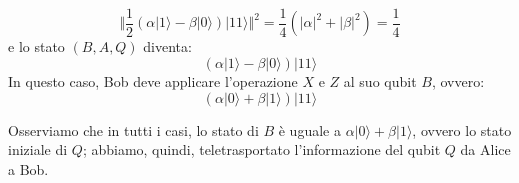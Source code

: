 \begin{itemize}
    \begin{equation*}
        \Vert \frac{1}{2}\left(\alpha |1\rangle - \beta |0\rangle\right)|11\rangle \Vert^2 = \frac{1}{4}\left(|\alpha|^2 + |\beta|^2\right) = \frac{1}{4}
    \end{equation*}
    e lo stato $(B,A,Q)$ diventa:
    \begin{equation*}
        \left(\alpha |1\rangle - \beta |0\rangle\right)|11\rangle
    \end{equation*}
    In questo caso, Bob deve applicare l'operazione $X$ e $Z$ al suo qubit $B$, ovvero:
    \begin{equation*}
        \left(\alpha |0\rangle + \beta |1\rangle\right)|11\rangle
    \end{equation*}
\end{itemize}
Osserviamo che in tutti i casi, lo stato di $B$ è uguale a $\alpha |0\rangle + \beta |1\rangle$, ovvero
lo stato iniziale di $Q$; abbiamo, quindi, teletrasportato l'informazione del qubit $Q$ da Alice
a Bob.